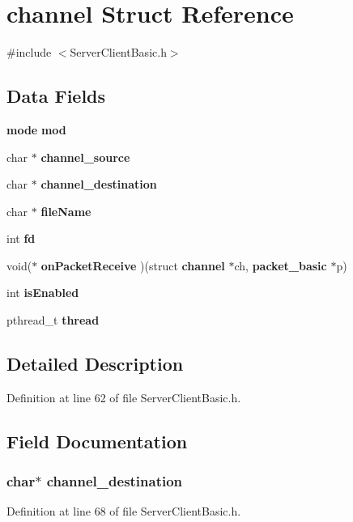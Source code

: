 \section{channel Struct Reference}
\label{structchannel}


{\ttfamily \#include $<$Server\+Client\+Basic.\+h$>$}

\subsection*{Data Fields}
\begin{DoxyCompactItemize}
\item 
{\bf mode} {\bf mod}
\item 
char $\ast$ {\bf channel\+\_\+source}
\item 
char $\ast$ {\bf channel\+\_\+destination}
\item 
char $\ast$ {\bf file\+Name}
\item 
int {\bf fd}
\item 
void($\ast$ {\bf on\+Packet\+Receive} )(struct {\bf channel} $\ast$ch, {\bf packet\+\_\+basic} $\ast$p)
\item 
int {\bf is\+Enabled}
\item 
pthread\+\_\+t {\bf thread}
\end{DoxyCompactItemize}


\subsection{Detailed Description}


Definition at line 62 of file Server\+Client\+Basic.\+h.



\subsection{Field Documentation}
\subsubsection[{channel\+\_\+destination}]{\setlength{\rightskip}{0pt plus 5cm}char$\ast$ channel\+\_\+destination}\label{structchannel_a459138b7f05f5d080fa284cea148e1ea}


Definition at line 68 of file Server\+Client\+Basic.\+h.

